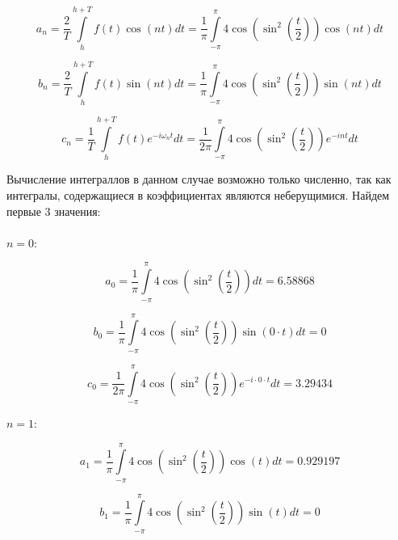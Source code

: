 \documentclass[a5paper, 10pt]{article}
\theoremstyle{definition}
\theoremstyle{plain}
\theoremstyle{remark}
\begin{document}
\begin{equation}
a_n = \frac{2}{T} \int \limits_{h}^{h + T} f(t) \cos (nt) dt =  \frac{1}{\pi}\int \limits_{-\pi}^{\pi} 4 \cos \left( \sin^2 \left( \frac{t}{2}\right) \right) \cos (nt) dt 
\end{equation}

\begin{equation}
b_n = \frac{2}{T} \int \limits_{h}^{h + T} f(t) \sin (nt) dt =  \frac{1}{\pi}\int \limits_{-\pi}^{\pi} 4 \cos \left( \sin^2 \left( \frac{t}{2}\right) \right) \sin (nt) dt 
\end{equation}

\begin{equation}
c_n = \frac{1}{T} \int \limits_{h}^{h + T} f(t) e^{-i \omega_n t} dt = \frac{1}{2 \pi} \int \limits_{-\pi}^{\pi} 4 \cos \left( \sin^2 \left( \frac{t}{2}\right) \right) e^{-i n t} dt 
\end{equation}

Вычисление интеграллов в данном случае возможно только численно, так как интегралы, содержащиеся в коэффициентах являются неберущимися. Найдем первые 3 значения:\\
\\
$n = 0:$

\begin{equation}
a_0 = \frac{1}{\pi}\int \limits_{-\pi}^{\pi} 4 \cos \left( \sin^2 \left( \frac{t}{2}\right) \right) dt = 6.58868
\end{equation}

\begin{equation}
b_0 =  \frac{1}{\pi}\int \limits_{-\pi}^{\pi} 4 \cos \left( \sin^2 \left( \frac{t}{2}\right) \right) \sin (0 \cdot t) dt = 0
\end{equation}

\begin{equation}
c_0 = \frac{1}{2 \pi} \int \limits_{-\pi}^{\pi} 4 \cos \left( \sin^2 \left( \frac{t}{2}\right) \right) e^{-i \cdot 0 \cdot t} dt = 3.29434
\end{equation}

$n = 1:$

\begin{equation}
a_1  =  \frac{1}{\pi}\int \limits_{-\pi}^{\pi} 4 \cos \left( \sin^2 \left( \frac{t}{2}\right) \right) \cos (t) dt = 0.929197
\end{equation}

\begin{equation}
b_1 =  \frac{1}{\pi}\int \limits_{-\pi}^{\pi} 4 \cos \left( \sin^2 \left( \frac{t}{2}\right) \right) \sin (t) dt  = 0
\end{equation}
\end{document}
